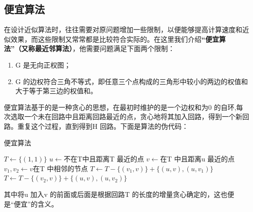 \documentclass[11pt,a4paper,openany]{book}
\begin{document}
\subsection{便宜算法}
\indent 在设计近似算法时，往往需要对原问题增加一些限制，以便能够提高计算速度和近似效果，而这些限制又常常都是比较符合实际的。在这里我们介绍\textbf{“便宜算法”（又称最近邻算法）}，他需要问题满足下面两个限制：\\
\begin{enumerate}
  \item G 是无向正权图；
  \item G 的边权符合三角不等式，即任意三个点构成的三角形中较小的两边的权值和大于等于第三边的权值和。
\end{enumerate}
\indent 便宜算法基于的是一种贪心的思想，在最初时维护的是一个边权和为0 的自环,每次选取一个未在回路中且距离回路最近的点，贪心地将其加入回路，得到一个新回路。重复这个过程，直到得到H 回路。下面是算法的伪代码：\\
\begin{algorithm}
\renewcommand{\algorithmicrequire}{\textbf{Input:}}
\renewcommand\algorithmicensure {\textbf{Output:}}
    \caption{便宜算法}
    \begin{algorithmic}[1]
      \label{alg:pysf}  %
      \STATE $T\leftarrow\{(1,1)\}$
          \STATE $u\leftarrow$不在T中且距离T 最近的点
          \STATE $v\leftarrow$在T 中且距离u 最近的点
          \STATE $v_1, v_2 \leftarrow v$在T 中相邻的节点
             \STATE $ T\leftarrow T −\{(v_1,v)\} + \{(u,v),(u,v_1)\}$
          \ELSE{}
              \STATE  $ T\leftarrow T −\{(v_2,v)\} + \{(u,v),(u,v_2)\}$
          \ENDIF
      \ENDWHILE

    \end{algorithmic}
\end{algorithm}
\indent 其中将u 加入v 的前面或后面是根据回路T 的长度的增量贪心确定的，这也便是“便宜”的含义。
\end{document}
